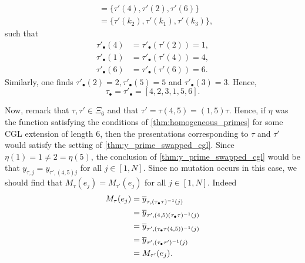 \begin{example}
\begin{align*}
		            & = \{\tau'(4), \tau'(2), \tau'(6)\}        \\
		            & = \{\tau'(k_2), \tau'(k_1), \tau'(k_3)\},
	\end{align*}
	such that
	\begin{align*}
		\tau'_\bullet(4) & = \tau'_\bullet(\tau'(2)) = 1, \\
		\tau'_\bullet(1) & = \tau'_\bullet(\tau'(4)) = 4, \\
		\tau'_\bullet(6) & = \tau'_\bullet(\tau'(6)) = 6.
	\end{align*}
	Similarly, one finds $\tau'_\bullet(2) = 2, \tau'_\bullet(5) = 5$ and $\tau'_\bullet(3)
		= 3$. Hence,
	\begin{equation*}
		\tau_\bullet = \tau'_\bullet = [4,2,3,1,5,6].
	\end{equation*}

	Now, remark that $\tau, \tau' \in \Xi_6$ and that $\tau' = \tau (4, 5) = (1,5) \tau$.
	Hence, if $\eta$ was the function satisfying the conditions of
	\cref{thm:homogeneous_primes} for some CGL extension of length 6, then the
	presentations corresponding to $\tau$ and $\tau'$ would satisfy the setting of
	\cref{thm:y_prime_swapped_cgl}. Since $\eta(1) = 1 \neq 2 = \eta(5)$, the conclusion of
	\cref{thm:y_prime_swapped_cgl} would be that $y_{\tau, j} = y_{\tau', (4,5)j}$ for all
	$j \in [1, N]$. Since no mutation occurs in this case, we should find that $M_\tau
		(e_j) = M_{\tau'}(e_j)$ for all $j \in [1, N]$. Indeed
	\begin{align*}
		M_{\tau}(e_j)
		 & = \overline{y}_{\tau, (\tau_\bullet \tau)^{-1} (j)}        \\
		 & = \overline{y}_{\tau', (4,5)(\tau_\bullet \tau)^{-1} (j)}  \\
		 & = \overline{y}_{\tau', (\tau_\bullet \tau (4,5))^{-1} (j)} \\
		 & = \overline{y}_{\tau', (\tau_\bullet \tau')^{-1} (j)}      \\
		 & = M_{\tau'}(e_j).
	\end{align*}
\end{example}
